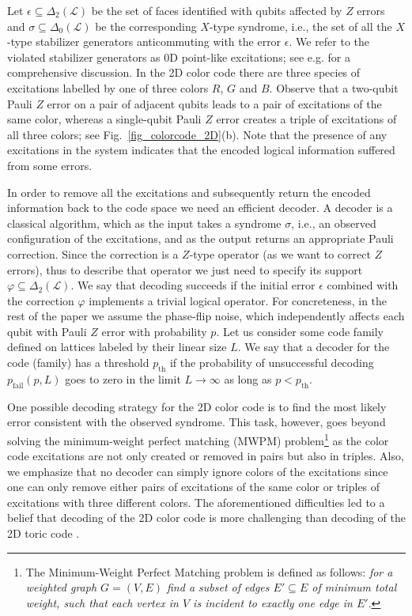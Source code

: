 \documentclass[onecolumn,letterpaper,11pt,accepted=2022-12-19]{quantumarticle}
\newcommand{\face}[2]{{\Delta_{#1}(#2)}}
\renewcommand{\phi}{\varphi}
\theoremstyle{definition}
\theoremstyle{lemma}
\theoremstyle{theorem}
\theoremstyle{corollary}
\begin{document}
Let $\epsilon\subseteq \face 2 {\mathcal{L}}$ be the set of faces identified with qubits affected by $Z$ errors and $\sigma\subseteq \face 0 {\mathcal{L}}$ be the corresponding $X$-type syndrome, i.e., the set of all the $X$-type stabilizer generators anticommuting with the error $\epsilon$.
We refer to the violated stabilizer generators as 0D point-like excitations; see e.g. \cite{Maskara2018} for a comprehensive discussion.
In the 2D color code there are three species of excitations labelled by one of three colors $R$, $G$ and $B$.
Observe that a two-qubit Pauli $Z$ error on a pair of adjacent qubits leads to a pair of excitations of the same color, whereas a single-qubit Pauli $Z$ error creates a triple of excitations of all three colors; see Fig.~\ref{fig_colorcode_2D}(b).
Note that the presence of any excitations in the system indicates that the encoded logical information suffered from some errors.


In order to remove all the excitations and subsequently return the encoded information back to the code space we need an efficient decoder.
A decoder is a classical algorithm, which as the input takes a syndrome $\sigma$, i.e., an observed configuration of the excitations, and as the output returns an appropriate Pauli correction.
Since the correction is a $Z$-type operator (as we want to correct $Z$ errors), thus to describe that operator we just need to specify its support $\phi\subseteq\face 2 {\mathcal{L}}$.
We say that decoding succeeds if the initial error $\epsilon$ combined with the correction $\phi$ implements a trivial logical operator.
For concreteness, in the rest of the paper we assume the phase-flip noise, which independently affects each qubit with Pauli $Z$ error with probability $p$.
Let us consider some code family defined on lattices labeled by their linear size $L$.
We say that a decoder for the code (family) has a threshold $p_{\textrm{th}}$ if the probability of unsuccessful decoding $p_{\textrm{fail}}(p,L)$ goes to zero in the limit $L\rightarrow \infty$ as long as $p < p_{\textrm{th}}$.


One possible decoding strategy for the 2D color code is to find the most likely error consistent with the observed syndrome.
This task, however, goes beyond solving the minimum-weight perfect matching (MWPM) problem\footnote{
The Minimum-Weight Perfect Matching problem is defined as follows: \emph{for a weighted graph $G=(V,E)$ find a subset of edges $E'\subseteq E$ of minimum total weight, such that each vertex in $V$ is incident to exactly one edge in $E'$}.}
as the color code excitations are not only created or removed in pairs but also in triples.
Also, we emphasize that no decoder can simply ignore colors of the excitations since one can only  remove either pairs of excitations of the same color or triples of excitations with three different colors.
The aforementioned difficulties led to a belief that decoding of the 2D color code is more challenging than decoding of the 2D toric code \cite{Wang2010,Landahl2011}.
\end{document}
